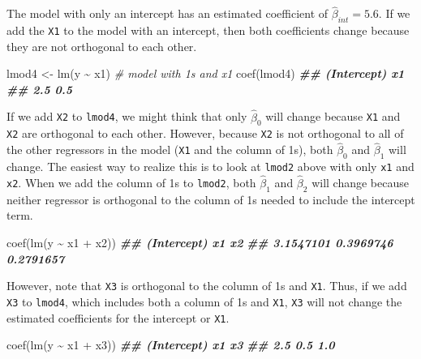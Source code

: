 \documentclass[
]{book}
\newenvironment{Shaded}{\begin{snugshade}}{\end{snugshade}}
\newcommand{\CommentTok}[1]{\textcolor[rgb]{0.56,0.35,0.01}{\textit{#1}}}
\newcommand{\DocumentationTok}[1]{\textcolor[rgb]{0.56,0.35,0.01}{\textbf{\textit{#1}}}}
\newcommand{\FunctionTok}[1]{\textcolor[rgb]{0.00,0.00,0.00}{#1}}
\newcommand{\NormalTok}[1]{#1}
\newcommand{\OtherTok}[1]{\textcolor[rgb]{0.56,0.35,0.01}{#1}}
\newcommand{\SpecialCharTok}[1]{\textcolor[rgb]{0.00,0.00,0.00}{#1}}
\theoremstyle{definition}
\theoremstyle{definition}
\theoremstyle{definition}
\theoremstyle{definition}
\theoremstyle{remark}
\begin{document}
The model with only an intercept has an estimated coefficient of
\(\hat{\beta}_{int}=5.6\). If we add the \texttt{X1} to the model with an
intercept, then both coefficients change because they are not orthogonal
to each other.

\begin{Shaded}
\begin{Highlighting}[]
\NormalTok{lmod4 }\OtherTok{\textless{}{-}} \FunctionTok{lm}\NormalTok{(y }\SpecialCharTok{\textasciitilde{}}\NormalTok{ x1) }\CommentTok{\# model with 1s and x1}
\FunctionTok{coef}\NormalTok{(lmod4)}
\DocumentationTok{\#\# (Intercept)          x1 }
\DocumentationTok{\#\#         2.5         0.5}
\end{Highlighting}
\end{Shaded}

If we add \texttt{X2} to \texttt{lmod4}, we might think that only \(\hat{\beta}_{0}\)
will change because \texttt{X1} and \texttt{X2} are orthogonal to each other. However,
because \texttt{X2} is not orthogonal to all of the other regressors in the
model (\texttt{X1} and the column of 1s), both \(\hat{\beta}_{0}\) and
\(\hat{\beta}_1\) will change. The easiest way to realize this is to look
at \texttt{lmod2} above with only \texttt{x1} and \texttt{x2}. When we add the column of 1s
to \texttt{lmod2}, both \(\hat{\beta}_1\) and \(\hat{\beta}_2\) will change because
neither regressor is orthogonal to the column of 1s needed to include
the intercept term.

\begin{Shaded}
\begin{Highlighting}[]
\FunctionTok{coef}\NormalTok{(}\FunctionTok{lm}\NormalTok{(y }\SpecialCharTok{\textasciitilde{}}\NormalTok{ x1 }\SpecialCharTok{+}\NormalTok{ x2))}
\DocumentationTok{\#\# (Intercept)          x1          x2 }
\DocumentationTok{\#\#   3.1547101   0.3969746   0.2791657}
\end{Highlighting}
\end{Shaded}

However, note that \texttt{X3} is orthogonal to the column of 1s and \texttt{X1}.
Thus, if we add \texttt{X3} to \texttt{lmod4}, which includes both a column of 1s and
\texttt{X1}, \texttt{X3} will not change the estimated coefficients for the intercept
or \texttt{X1}.

\begin{Shaded}
\begin{Highlighting}[]
\FunctionTok{coef}\NormalTok{(}\FunctionTok{lm}\NormalTok{(y }\SpecialCharTok{\textasciitilde{}}\NormalTok{ x1 }\SpecialCharTok{+}\NormalTok{ x3))}
\DocumentationTok{\#\# (Intercept)          x1          x3 }
\DocumentationTok{\#\#         2.5         0.5         1.0}
\end{Highlighting}
\end{Shaded}
\end{document}
